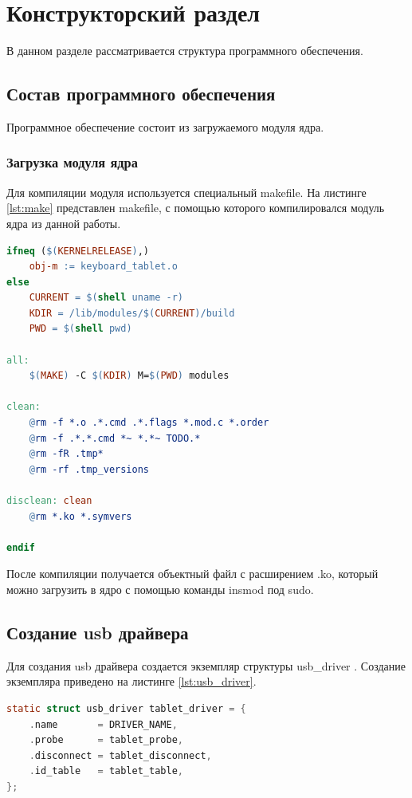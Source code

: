 \chapter{Конструкторский раздел}
\label{cha:design}

В данном разделе рассматривается структура программного обеспечения.

\section{Состав программного обеспечения}

Программное обеспечение состоит из загружаемого модуля ядра.

\subsection{Загрузка модуля ядра}

Для компиляции модуля используется специальный makefile. На листинге \ref{lst:make} представлен makefile, с помощью которого компилировался модуль ядра из данной работы.

\begin{lstlisting}[language=make,caption=Makefile для компиляции модуля ядра,label=lst:make]
ifneq ($(KERNELRELEASE),)
    obj-m := keyboard_tablet.o
else
    CURRENT = $(shell uname -r)
    KDIR = /lib/modules/$(CURRENT)/build
    PWD = $(shell pwd)

all:
    $(MAKE) -C $(KDIR) M=$(PWD) modules

clean:
    @rm -f *.o .*.cmd .*.flags *.mod.c *.order
    @rm -f .*.*.cmd *~ *.*~ TODO.*
    @rm -fR .tmp*
    @rm -rf .tmp_versions

disclean: clean
    @rm *.ko *.symvers

endif
\end{lstlisting}

После компиляции получается объектный файл с расширением .ko, который можно загрузить в ядро с помощью команды insmod под sudo.

\section{Создание usb драйвера}

Для создания usb драйвера создается экземпляр структуры usb\_driver \cite{Usb_driver}. Создание экземпляра приведено на листинге \ref{lst:usb_driver}.

\begin{lstlisting}[language=c,caption=Создание экземпляра usb драйвера,label=lst:usb_driver]
static struct usb_driver tablet_driver = {
    .name       = DRIVER_NAME,
    .probe      = tablet_probe,
    .disconnect = tablet_disconnect,
    .id_table   = tablet_table,
};
\end{lstlisting}

